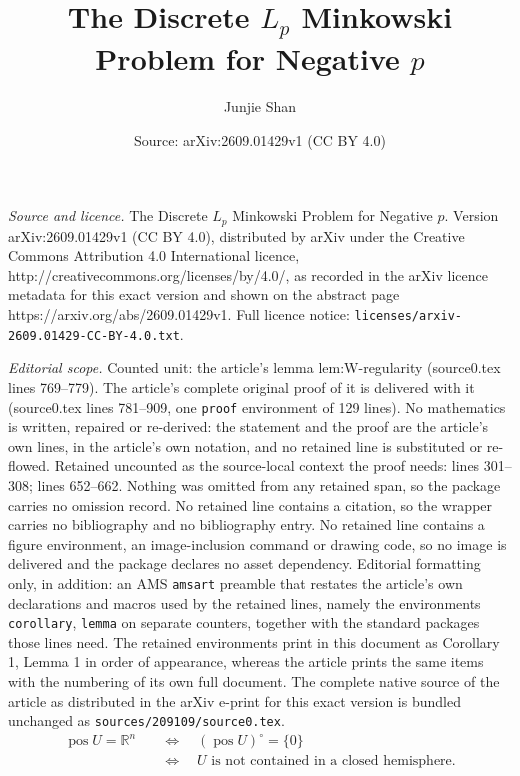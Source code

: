 \documentclass[10pt,a4paper]{amsart}
\title{The Discrete $L_p$ Minkowski Problem for Negative $p$}
\author{Junjie Shan}
\date{Source: arXiv:2609.01429v1 (CC BY 4.0)}
\newcommand{\R}{\mathbb R}
\DeclareMathOperator{\pos}{pos}
\begin{document}
\maketitle

\noindent\emph{Source and licence.} The Discrete $L_p$ Minkowski Problem for Negative $p$. Version arXiv:2609.01429v1 (CC BY 4.0), distributed by arXiv under the Creative Commons Attribution 4.0 International licence, http://creativecommons.org/licenses/by/4.0/, as recorded in the arXiv licence metadata for this exact version and shown on the abstract page https://arxiv.org/abs/2609.01429v1. Full licence notice: \texttt{licenses/arxiv-2609.01429-CC-BY-4.0.txt}.\par\smallskip

\noindent\textit{Editorial scope.} Counted unit: the article's lemma lem:W-regularity (source0.tex lines 769--779). The article's complete original proof of it is delivered with it (source0.tex lines 781--909, one \texttt{proof} environment of 129 lines). No mathematics is written, repaired or re-derived: the statement and the proof are the article's own lines, in the article's own notation, and no retained line is substituted or re-flowed.  Retained uncounted as the source-local context the proof needs: lines 301--308; lines 652--662.  Nothing was omitted from any retained span, so the package carries no omission record.  No retained line contains a citation, so the wrapper carries no bibliography and no bibliography entry.  No retained line contains a figure environment, an image-inclusion command or drawing code, so no image is delivered and the package declares no asset dependency.  Editorial formatting only, in addition: an AMS \texttt{amsart} preamble that restates the article's own declarations and macros used by the retained lines, namely the environments \texttt{corollary}, \texttt{lemma} on separate counters, together with the standard packages those lines need.  The retained environments print in this document as Corollary 1, Lemma 1 in order of appearance, whereas the article prints the same items with the numbering of its own full document.  The complete native source of the article as distributed in the arXiv e-print for this exact version is bundled unchanged as \texttt{sources/209109/source0.tex}.
\begin{equation}\label{eq:positive-span-separation}
 \begin{aligned}
  \pos U=\R^n
  &\quad\Longleftrightarrow\quad (\pos U)^\circ=\{0\}\\
  &\quad\Longleftrightarrow\quad
  U\text{ is not contained in a closed hemisphere}.
 \end{aligned}
\end{equation}
\end{document}
